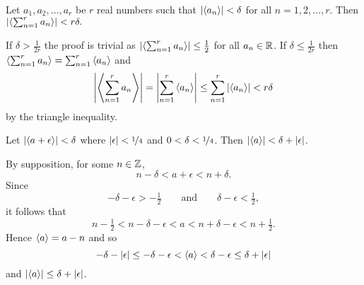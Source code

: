 \documentclass[journal]{IEEEtran}
\begin{document}
 \begin{lemma} \label{lem:fracpartsumanddelta}
 Let $a_1, a_2, \dots, a_r$ be $r$ real numbers such  that $\left|\left\langle a_n \right\rangle\right| < \delta$ for all $n = 1,2,\dots,r$.  Then $\left|\left\langle \sum_{n=1}^r{a_n} \right\rangle\right| < r\delta.$
 \end{lemma}
 \begin{IEEEproof}
 If $\delta > \tfrac{1}{2r}$ the proof is trivial as $\left|\left\langle \sum_{n=1}^r{a_n} \right\rangle\right| \leq \tfrac{1}{2}$ for all $a_n \in {\mathbb R}$.  If $\delta \leq \tfrac{1}{2r}$ then $\left\langle \sum_{n=1}^r{a_n} \right\rangle = \sum_{n=1}^r{\left\langle a_n \right\rangle}$ and
 \[
 \left\vert\left\langle \sum_{n=1}^r{a_n} \right\rangle\right\vert = \left\vert\sum_{n=1}^r{\left\langle a_n \right\rangle}\right\vert \leq \sum_{n=1}^r{\left\vert\left\langle a_n \right\rangle\right\vert} < r\delta
 \]
 by the triangle inequality.
 \end{IEEEproof}


\begin{lemma} \label{lem:fracpartinternalsumlessdelta}
Let $\left|\left\langle a + \epsilon \right\rangle\right| < \delta$ where $|\epsilon| < \nicefrac{1}{4}$ and $0<\delta<\nicefrac{1}{4}$. Then $\left|\left\langle a \right\rangle\right| < \delta + |\epsilon|$.
\end{lemma}
\begin{IEEEproof}
By supposition, for some $n \in {\mathbb Z}$,
\[
n - \delta < a + \epsilon < n + \delta.
\]
Since 
\[
-\delta - \epsilon > -\tfrac{1}{2} \qquad \text{and} \qquad \delta - \epsilon < \tfrac{1}{2},
\]
it follows that
\[
n - \tfrac{1}{2} < n - \delta - \epsilon < a < n + \delta - \epsilon < n + \tfrac{1}{2}.
\]
Hence $\left\langle a \right\rangle = a - n$ and so
\[
-\delta - \left\vert \epsilon \right\vert \leq -\delta - \epsilon < \left\langle a \right\rangle < \delta - \epsilon \leq \delta + \left\vert \epsilon \right\vert
\]
and $\left\vert \left\langle a \right\rangle \right\vert \leq \delta + \left\vert \epsilon \right\vert$.

\end{IEEEproof}
\end{document}
